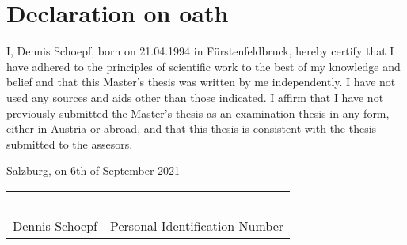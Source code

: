 \section*{Declaration on oath}

I, Dennis Schoepf, born on 21.04.1994 in Fürstenfeldbruck, hereby certify that I have adhered to the principles of scientific work to the best of my knowledge and belief and that this Master's thesis was written by me independently. I have not used any sources and aids other than those indicated.
I affirm that I have not previously submitted the Master's thesis as an examination thesis in any form, either in Austria or abroad, and that this thesis is consistent with the thesis submitted to the assesors.

\raggedright
\vspace{0.6cm}
Salzburg, on 6th of September 2021

\vspace{1.6cm}
\begin{tabularx}{\textwidth}{XX}
  ~ & ~ \\ 
  Dennis Schoepf & Personal Identification Number \\
\end{tabularx}

